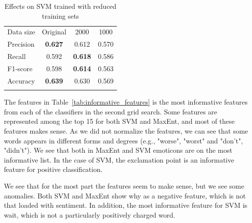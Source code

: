 \begin{table}[!htb]
	\centering
	\begin{tabular}{l|ccc} 
	\noalign{\smallskip}\hline\noalign{\smallskip}
	Data size  & Original       & 2000   & 1000 \\
	\noalign{\smallskip}\hline\noalign{\smallskip}
	Precision  & {\bf 0.627}  & 0.612 & 0.570 \\
	Recall       & 0.592  & \textbf{0.618} & 0.586 \\
	F1-score  & 0.598  & \textbf{0.614} & 0.563 \\
	Accuracy & {\bf 0.639}  & 0.630 & 0.569 \\
	\noalign{\smallskip}\hline\noalign{\smallskip}
	\end{tabular}
	\caption{Effects on SVM trained with reduced training sets}
	\label{tab:svm_reduced}
\end{table}

The features in Table~\ref{tab:informative_features} is the most informative features from each of the classifiers in the second grid search. Some features are represented among the top 15 for both SVM and MaxEnt, and most of these features makes sense. As we did not normalize the features, we can see that some words appears in different forms and degrees (e.g., "worse", "worst" and "don't", "didn't"). We see that both in MaxEnt and SVM emoticons are on the most informative list. In the case of SVM, the exclamation point is an informative feature for positive classification.

We see that for the most part the features seem to make sense, but we see some anomalies. Both SVM and MaxEnt show why as a negative feature, which is not that loaded with sentiment. In addition, the most informative feature for SVM is wait, which is not a particularly positively charged word.

